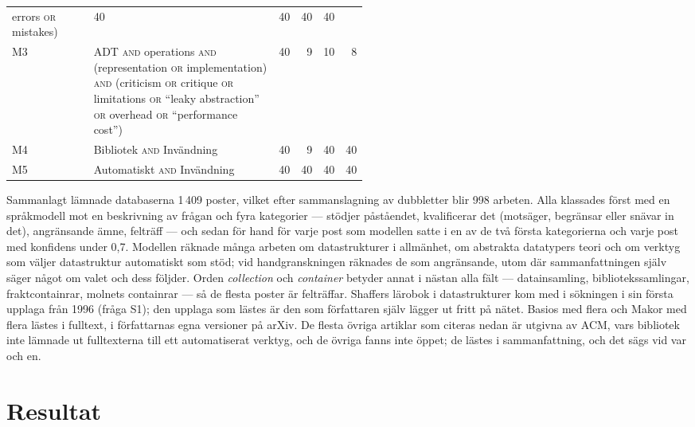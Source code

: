 \begin{table}[!b]
\begin{tabular}{@{}lp{0.52\linewidth}rrrr@{}}
         errors \textsc{or} mistakes)
       & 40 & 40 & 40 & 40 \\
    M3 & ADT \textsc{and} operations \textsc{and} (representation
         \textsc{or} implementation) \textsc{and} (criticism \textsc{or}
         critique \textsc{or} limitations \textsc{or} \enquote{leaky
         abstraction} \textsc{or} overhead \textsc{or}
         \enquote{performance cost})
       & 40 & 9 & 10 & 8 \\
    M4 & Bibliotek \textsc{and} Invändning & 40 & 9 & 40 & 40 \\
    M5 & Automatiskt \textsc{and} Invändning & 40 & 40 & 40 & 40 \\
    \bottomrule
  \end{tabular}
\end{table}

Sammanlagt lämnade databaserna 1\,409 poster, vilket efter
sammanslagning av dubbletter blir 998 arbeten.  Alla klassades först
med en språkmodell mot en beskrivning av frågan och fyra kategorier ---
stödjer påståendet, kvalificerar det (motsäger, begränsar eller snävar
in det), angränsande ämne, felträff --- och sedan för hand för varje
post som modellen satte i en av de två första kategorierna och varje
post med konfidens under 0,7.  Modellen räknade många arbeten om
datastrukturer i allmänhet, om abstrakta datatypers teori och om
verktyg som väljer datastruktur automatiskt som stöd; vid
handgranskningen räknades de som angränsande, utom där sammanfattningen
själv säger något om valet och dess följder.  Orden \emph{collection} och
\emph{container} betyder annat i nästan alla fält --- datainsamling,
bibliotekssamlingar, fraktcontainrar, molnets containrar --- så de
flesta poster är felträffar.  Shaffers lärobok i datastrukturer kom med
i sökningen i sin första upplaga från 1996 (fråga S1); den upplaga som
lästes är den som författaren själv lägger ut fritt på
nätet\autocite{Shaffer2013DSA}.  Basios med flera och Makor med flera lästes
i fulltext, i författarnas egna versioner på
arXiv\autocite{Basios2018Darwinian,Makor2025Profile}.  De flesta övriga
artiklar som citeras nedan är utgivna av ACM, vars bibliotek inte
lämnade ut fulltexterna till ett automatiserat verktyg, och de övriga
fanns inte öppet; de lästes i sammanfattning, och det sägs vid var och
en.

\section{Resultat}
\label{sec:vb-resultat}

